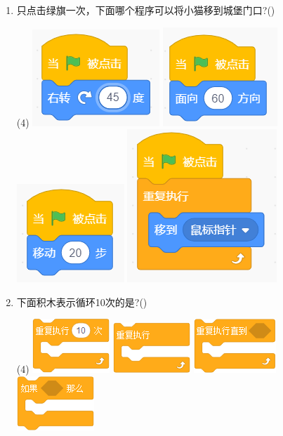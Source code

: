 \documentclass[10pt, a4paper]{article}
\begin{document}
\begin{enumerate}
        \item 只点击绿旗一次，下面哪个程序可以将小猫移到城堡门口?(\qquad)
        \begin{tasks}(4)
            \task \includegraphics[width=.1\textwidth]{16a.png}
            \task \includegraphics[width=.1\textwidth]{16b.png}
            \task \includegraphics[width=.1\textwidth]{16c.png}
            \task \includegraphics[width=.1\textwidth]{16d.png}
        \end{tasks}

        \item 下面积木表示循环10次的是?(\qquad)
        \begin{tasks}(4)
            \task \includegraphics[width=.1\textwidth]{17a.png}
            \task \includegraphics[width=.1\textwidth]{17b.png}
            \task \includegraphics[width=.1\textwidth]{17c.png}
            \task \includegraphics[width=.1\textwidth]{17d.png}
        \end{tasks}


\end{enumerate}
\end{document}

